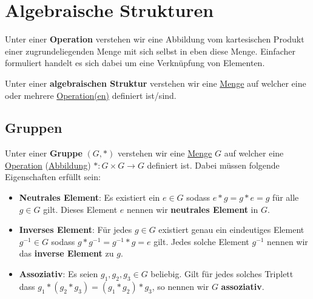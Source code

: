 \documentclass[../../main.tex]{subfiles}
\begin{document}
	
	\chapter{Algebraische Strukturen}
	
		\begin{definition}[Operation]
			\label{def:Operation}
			Unter einer \textbf{Operation} verstehen wir eine Abbildung vom kartesischen Produkt einer zugrundeliegenden Menge mit sich selbst in eben diese Menge. Einfacher formuliert handelt es sich dabei um eine Verknüpfung von Elementen. 
		\end{definition}
	
		\begin{definition}
			\label{def:AlgebraischeStrutur}
			Unter einer \textbf{algebraischen Struktur} verstehen wir eine \hyperref[def:Menge]{Menge} auf welcher eine oder mehrere \hyperref[def:Operation]{Operation(en)} definiert ist/sind.
		\end{definition}
	
		\section{Gruppen}
	
		\begin{definition}
			\label{def:Gruppe}
			\label{def:neutralesElement}
			\label{def:inversesElement}
			\label{def:assoziativ}
			Unter einer \textbf{Gruppe} $(G,*)$ verstehen wir eine \hyperref[def:Menge]{Menge} $G$ auf welcher eine \hyperref[def:Operation]{Operation} (\hyperref[def:Abbildung]{Abbildung}) $*: G \times G \rightarrow G$ definiert ist. Dabei müssen folgende Eigenschaften erfüllt sein:
			\begin{itemize}
				\item \textbf{Neutrales Element}: Es existiert ein $e \in G$ sodass $e * g = g * e = g$ für alle $g\in G$ gilt. Dieses Element $e$ nennen wir \textbf{neutrales Element} in $G$.
				\item \textbf{Inverses Element}: Für jedes $g \in G$ existiert genau ein eindeutiges Element $g^{-1} \in G$ sodass $g * g^{-1} = g^{-1} * g = e$ gilt. Jedes solche Element $g^{-1}$ nennen wir das \textbf{inverse Element} zu $g$.
				\item \textbf{Assoziativ}: Es seien $g_1, g_2,g_3 \in G$ beliebig. Gilt für jedes solches Triplett dass $g_1 * (g_2 * g_3) = (g_1 * g_2) * g_3$, so nennen wir $G$ \textbf{assoziativ}. 
			\end{itemize}
		\end{definition}
	
\end{document}
